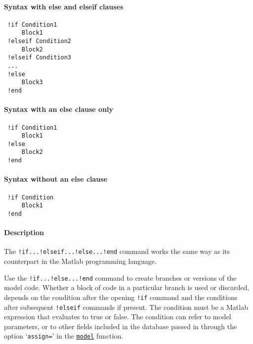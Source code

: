 


	\paragraph{Syntax with else and elseif clauses}
 
 \begin{verbatim}
 !if Condition1
     Block1
 !elseif Condition2
     Block2
 !elseif Condition3
 ...
 !else
     Block3
 !end
 \end{verbatim}
 
 \paragraph{Syntax with an else clause only}
 
 \begin{verbatim}
 !if Condition1
     Block1
 !else
     Block2
 !end
 \end{verbatim}
 
 \paragraph{Syntax without an else clause}
 
 \begin{verbatim}
 !if Condition
     Block1
 !end
 \end{verbatim}
 
 \paragraph{Description}
 
 The \texttt{!if...!elseif...!else...!end} command works the same way as
 its counterpart in the Matlab programming language.
 
 Use the \texttt{!if...!else...!end} command to create branches or
 versions of the model code. Whether a block of code in a particular
 branch is used or discarded, depends on the condition after the opening
 \texttt{!if} command and the conditions after subsequent
 \texttt{!elseif} commands if present. The condition must be a Matlab
 expression that evaluates to true or false. The condition can refer to
 model parameters, or to other fields included in the database passed in
 through the option `\texttt{assign=}' in the
 \href{model/model}{\texttt{model}} function.
 
